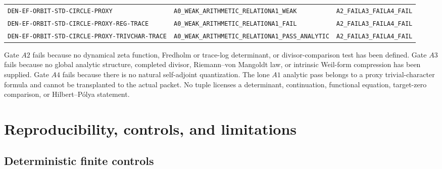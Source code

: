 \documentclass[11pt]{article}
\theoremstyle{definition}
\begin{document}
\begin{table}[htbp]
\begin{tabularx}{\textwidth}{P{0.36\textwidth}P{0.36\textwidth}Y}
\texttt{DEN-EF-ORBIT-STD-}\newline\texttt{CIRCLE-PROXY} & \texttt{A0\_WEAK\_ARITHMETIC\_}\newline\texttt{RELATION}\newline\texttt{A1\_WEAK} & \texttt{A2\_FAIL}\newline\texttt{A3\_FAIL}\newline\texttt{A4\_FAIL}\\
\texttt{DEN-EF-ORBIT-STD-CIRCLE-}\newline\texttt{PROXY-REG-TRACE} & \texttt{A0\_WEAK\_ARITHMETIC\_}\newline\texttt{RELATION}\newline\texttt{A1\_FAIL} & \texttt{A2\_FAIL}\newline\texttt{A3\_FAIL}\newline\texttt{A4\_FAIL}\\
\texttt{DEN-EF-ORBIT-STD-CIRCLE-}\newline\texttt{PROXY-TRIVCHAR-TRACE} & \texttt{A0\_WEAK\_ARITHMETIC\_}\newline\texttt{RELATION}\newline\texttt{A1\_PASS\_ANALYTIC} & \texttt{A2\_FAIL}\newline\texttt{A3\_FAIL}\newline\texttt{A4\_FAIL}\\
\bottomrule
\end{tabularx}
\end{table}

Gate \(A2\) fails because no dynamical zeta function, Fredholm or trace-log determinant, or divisor-comparison test has been defined.  Gate \(A3\) fails because no global analytic structure, completed divisor, Riemann--von Mangoldt law, or intrinsic Weil-form compression has been supplied.  Gate \(A4\) fails because there is no natural self-adjoint quantization.  The lone \(A1\) analytic pass belongs to a proxy trivial-character formula and cannot be transplanted to the actual packet.  No tuple licenses a determinant, continuation, functional equation, target-zero comparison, or Hilbert--Pólya statement.

\section{Reproducibility, controls, and limitations}\label{sec:controls}

\subsection{Deterministic finite controls}
\end{document}
